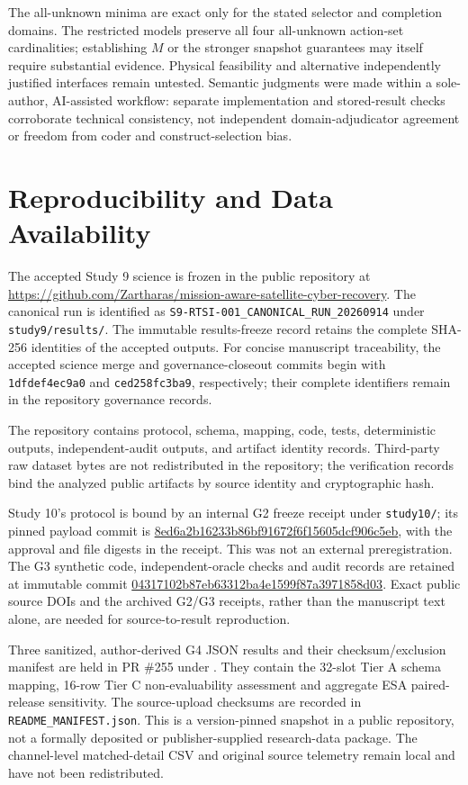 \documentclass[preprint,12pt]{elsarticle}
\begin{document}
The all-unknown minima are exact only for the stated selector and completion domains. The restricted models preserve all four all-unknown action-set cardinalities; establishing $M$ or the stronger snapshot guarantees may itself require substantial evidence. Physical feasibility and alternative independently justified interfaces remain untested. Semantic judgments were made within a sole-author, AI-assisted workflow: separate implementation and stored-result checks corroborate technical consistency, not independent domain-adjudicator agreement or freedom from coder and construct-selection bias.

\section{Reproducibility and Data Availability}

The accepted Study 9 science is frozen in the public repository at
\url{https://github.com/Zartharas/mission-aware-satellite-cyber-recovery}.
The canonical run is identified as
\texttt{S9-RTSI-001\_CANONICAL\_RUN\_20260914} under \texttt{study9/results/}.
The immutable results-freeze record retains the complete SHA-256 identities of the accepted outputs. For concise manuscript traceability, the accepted science merge and governance-closeout commits begin with \texttt{1dfdef4ec9a0} and \texttt{ced258fc3ba9}, respectively; their complete identifiers remain in the repository governance records.

The repository contains protocol, schema, mapping, code, tests, deterministic outputs, independent-audit outputs, and artifact identity records. Third-party raw dataset bytes are not redistributed in the repository; the verification records bind the analyzed public artifacts by source identity and cryptographic hash.


Study 10's protocol is bound by an internal G2 freeze receipt under \texttt{study10/}; its pinned payload commit is \url{8ed6a2b16233b86bf91672f6f15605dcf906c5eb}, with the approval and file digests in the receipt. This was not an external preregistration. The G3 synthetic code, independent-oracle checks and audit records are retained at immutable commit \url{04317102b87eb63312ba4e1599f87a3971858d03}. Exact public source DOIs and the archived G2/G3 receipts, rather than the manuscript text alone, are needed for source-to-result reproduction.

Three sanitized, author-derived G4 JSON results and their checksum/exclusion manifest are held in PR \#255 under . They contain the 32-slot Tier A schema mapping, 16-row Tier C non-evaluability assessment and aggregate ESA paired-release sensitivity. The source-upload checksums are recorded in \texttt{README\_MANIFEST.json}. This is a version-pinned snapshot in a public repository, not a formally deposited or publisher-supplied research-data package. The channel-level matched-detail CSV and original source telemetry remain local and have not been redistributed.
\end{document}
